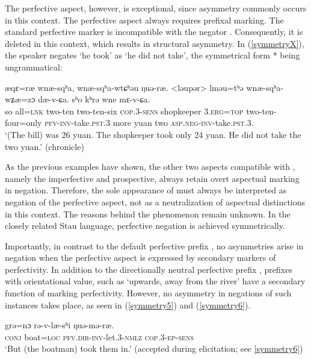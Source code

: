 \documentclass[output=paper,colorlinks,citecolor=brown]{langscibook}
\begin{document}
The perfective aspect, however, is exceptional, since asymmetry commonly occurs in this context. The perfective aspect always requires prefixal marking. The standard perfective marker  is incompatible with the negator . Consequently, it is deleted in this context, which results in structural asymmetry. In (\ref{symmetryX}), the speaker negates  `he took' as   `he did not take', the symmetrical form  * being ungrammatical:

{\ea
\label{symmetryX}
 		{æqɛ=ræ} 		{wnæ-sqʰa}, 		{wnæ-sqʰa-wtɕʰəu} 	{ŋuə-ræ}.	<{ləupər}> 		{lməu=tʰə} 		{wnæ-sqʰa-wʑæ=zɔ} 		{dæ-v-ɕa.}    {sʰo}			{kʰrə}			{wne}     {mɛ-v-ɕa.}\\  	
so	all=\textsc{lnk}		two-ten		two-ten-six \textsc{cop}.3-\textsc{sens}		shopkeeper		\textsc{3.erg=top} two-ten-four=only	\textsc{pfv-inv}-take.\textsc{pst}.3
	more			yuan			two			\textsc{asp.neg-inv}-take.\textsc{pst}.3.\\ 
\glt `(The bill) was 26 yuan. The shopkeeper took only 24 yuan. He did not take the two yuan.' (chronicle)
\z
}

As the previous examples have shown, the other two aspects compatible with , namely the  imperfective and prospective, always retain overt aspectual marking in negation. Therefore, the sole appearance of  must always be interpreted as negation of the perfective aspect, not as a neutralization of aspectual distinctions in this context. The reasons behind the phenomenon remain unknown. In the closely related Stau language, perfective negation is achieved symmetrically.

Importantly, in contrast to the default perfective prefix  , no asymmetries arise in negation when the perfective aspect is expressed by secondary markers of perfectivity. In addition to the directionally neutral perfective prefix , prefixes with orientational value, such as  `upwards, away from the river' have a secondary function of marking perfectivity. However, no asymmetry in negations of such instances takes place, as seen in (\ref{symmetry5}) and (\ref{symmetry6}).

\ea
\label{symmetry5}
	{grə=nɔ} 			{rə-v-læ-sʰi}		{ŋuə-mə-ræ.}\\
\textsc{conj}   boat=\textsc{loc}	\textsc{pfv.dir-inv}-let.3-\textsc{nmlz}	\textsc{cop}.3-\textsc{ep-sens}\\ 
\glt `But (the boatman) took them in.' (accepted during elicitation; see \ref{symmetry6})
\z
\end{document}
